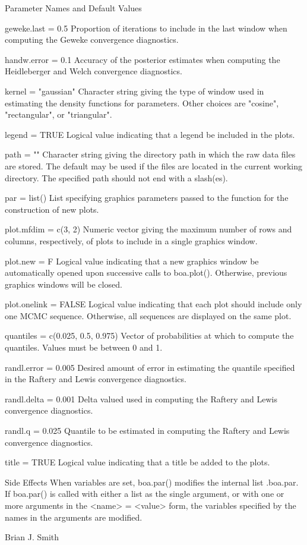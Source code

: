 \begin{Section}{Parameter Names and Default Values}
{\item[geweke.last = 0.5] Proportion of iterations to include in the last 
window when computing the Geweke convergence diagnostics.
\item[handw.error = 0.1] Accuracy of the posterior estimates when computing 
the Heidleberger and Welch convergence diagnostics.
\item[kernel = "gaussian"] Character string giving the type of window used in 
estimating the density functions for parameters. Other choices are "cosine", 
"rectangular", or "triangular".
\item[legend = TRUE] Logical value indicating that a legend be included in 
the plots.
\item[path = ""] Character string giving the directory path in which the raw 
data files are stored. The default may be used if the files are located in 
the current working directory.  The specified path should not end with a
slash(es).
\item[par = list()] List specifying graphics parameters passed to the 
function for the construction of new plots.
\item[plot.mfdim = c(3, 2)] Numeric vector giving the maximum number of rows 
and columns, respectively, of plots to include in a single graphics window.
\item[plot.new = F] Logical value indicating that a new graphics window be 
automatically opened upon successive calls to boa.plot(). Otherwise, previous 
graphics windows will be closed.
\item[plot.onelink = FALSE] Logical value indicating that each plot should include 
only one MCMC sequence. Otherwise, all sequences are displayed on the same plot.
\item[quantiles = c(0.025, 0.5, 0.975)] Vector of probabilities at which to 
compute the quantiles. Values must be between 0 and 1.
\item[randl.error = 0.005] Desired amount of error in estimating the quantile 
specified in the Raftery and Lewis convergence diagnostics.
\item[randl.delta = 0.001] Delta valued used in computing the Raftery and Lewis 
convergence diagnostics.
\item[randl.q = 0.025] Quantile to be estimated in computing the Raftery and 
Lewis convergence diagnostics.
\item[title = TRUE] Logical value indicating that a title be added to the
plots.
}
\end{Section}
\begin{Section}{Side Effects}
When variables are set, boa.par() modifies the internal list .boa.par. If 
boa.par() is called with either a list as the single argument, or with one or 
more arguments in the <name> = <value> form, the variables specified by the 
names in the arguments are modified.
\end{Section}
\begin{Author}\relax
Brian J. Smith
\end{Author}

